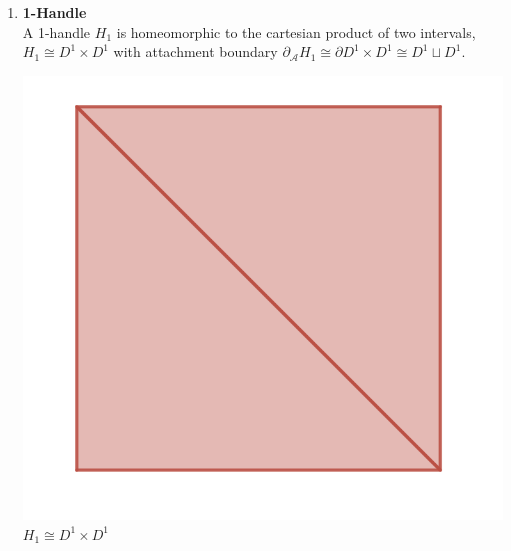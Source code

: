 \documentclass[12pt]{article}
\newcommand{\cA}{{\mathcal A}}
\theoremstyle{definition}
\begin{document}
\begin{enumerate}
\begin{center}
		  \end{center}
	\item \textbf{1-Handle}\\
		  A 1-handle $H_1$ is homeomorphic to the cartesian product of two intervals, $H_1 \cong D^1\times D^1$ with attachment boundary $\partial_\cA H_1 \cong \partial D^1 \times D^1 \cong D^1 \sqcup D^1$. 
		  \begin{center}
				\includegraphics[scale=0.5]{square.png} \\
				$H_1 \cong D^1\times D^1$


\end{center}
\end{enumerate}
\end{document}

